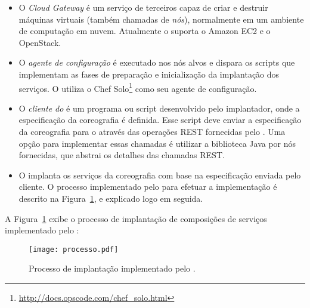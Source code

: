 \begin{itemize}

\item O \emph{Cloud Gateway} é um serviço de terceiros capaz de criar e destruir máquinas virtuais 
(também chamadas de \emph{nós}), normalmente em um ambiente de computação em nuvem. 
Atualmente o \ee suporta o Amazon EC2 e o OpenStack.

\item O \emph{agente de configuração} é executado nos nós alvos
e dispara os scripts que implementam as fases de preparação
e inicialização da implantação dos serviços.
O \ee utiliza o Chef Solo\footnote{\url{http://docs.opscode.com/chef_solo.html}}
como seu agente de configuração.

\item O \emph{cliente do \ee} é um programa ou script desenvolvido
pelo implantador, onde a especificação da coreografia é definida.
Esse script deve enviar a especificação da coreografia para o \ee
através das operações REST fornecidas pelo \ee.
Uma opção para implementar essas chamadas é utilizar
a biblioteca Java por nós fornecidas, que abstrai os detalhes
das chamadas REST.

\item O \emph{\ee} implanta os serviços da coreografia
com base na especificação enviada pelo cliente.
O processo implementado pelo \ee para efetuar a implementação
é descrito na Figura~\ref{fig:processo}, e explicado logo em seguida. 

\end{itemize} 

A Figura~\ref{fig:processo} exibe o processo de implantação de composições
de serviços implementado pelo \ee:

\begin{figure}[ht]
\centering
\texttt{[image: processo.pdf]}
\caption{Processo de implantação implementado pelo \ee.}
\label{fig:processo}
\end{figure}

